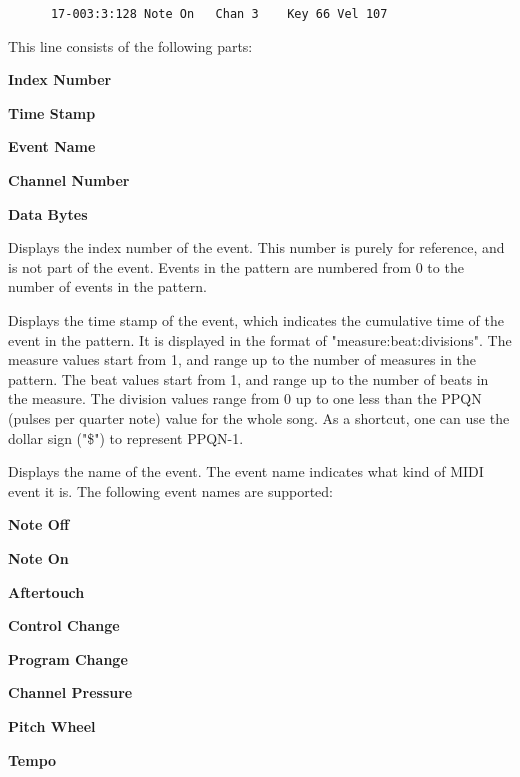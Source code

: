    \begin{verbatim}
      17-003:3:128 Note On   Chan 3    Key 66 Vel 107
   \end{verbatim}

   This line consists of the following parts:

   \begin{enumber}
      \item \textbf{Index Number}
      \item \textbf{Time Stamp}
      \item \textbf{Event Name}
      \item \textbf{Channel Number}
      \item \textbf{Data Bytes}
   \end{enumber}

   \setcounter{ItemCounter}{0}      %

   Displays the index number of the event.
   This number is purely for reference, and is not part
   of the event.  Events in the pattern are numbered from 0 to the number of
   events in the pattern.

   Displays the time stamp of the event,
   which indicates the cumulative time of the event in the pattern.
   It is displayed in the format of "measure:beat:divisions".
   The measure values start from 1, and range up to the number of measures in
   the pattern.
   The beat values start from 1, and range up to the number of beats in the
   measure.
   The division values range from 0 up to one less than the
   PPQN (pulses per quarter note) value for the whole song.
   As a shortcut, one can use the dollar sign ("\$") to represent
   PPQN-1.

   Displays the name of the event.
   The event name indicates what kind of MIDI event it is. 
   The following event names are supported:

   \begin{enumber}
      \item \textbf{Note Off}
      \item \textbf{Note On}
      \item \textbf{Aftertouch}
      \item \textbf{Control Change}
      \item \textbf{Program Change}
      \item \textbf{Channel Pressure}
      \item \textbf{Pitch Wheel}
      \item \textbf{Tempo}
   \end{enumber}

